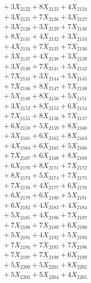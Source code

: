 \documentclass[a4paper,10pt]{article}
\begin{document}
{\begin{align}
&\;  + 3 X_{2122} + 8 X_{2123} + 4 X_{2124} \\[0.3ex]
&\;  + 3 X_{2125} + 7 X_{2126} + 3 X_{2127} \\[0.3ex]
&\;  + 3 X_{2128} + 3 X_{2129} + 7 X_{2130} \\[0.3ex]
&\;  + 8 X_{2131} + 4 X_{2132} + 3 X_{2133} \\[0.3ex]
&\;  + 4 X_{2134} + 7 X_{2135} + 7 X_{2136} \\[0.3ex]
&\;  + 3 X_{2137} + 4 X_{2138} + 3 X_{2139} \\[0.5ex]\allowbreak
&\;  + 3 X_{2140} + 7 X_{2141} + 5 X_{2142} \\[0.3ex]
&\;  + 7 X_{2143} + 3 X_{2144} + 5 X_{2145} \\[0.3ex]
&\;  + 7 X_{2146} + 8 X_{2147} + 7 X_{2148} \\[0.3ex]
&\;  + 5 X_{2149} + 8 X_{2150} + 5 X_{2151} \\[0.3ex]
&\;  + 3 X_{2152} + 8 X_{2153} + 6 X_{2154} \\[0.3ex]
&\;  + 7 X_{2155} + 8 X_{2156} + 7 X_{2157} \\[0.3ex]
&\;  + 6 X_{2158} + 5 X_{2159} + 8 X_{2160} \\[0.3ex]
&\;  + 3 X_{2161} + 6 X_{2162} + 8 X_{2163} \\[0.3ex]
&\;  + 4 X_{2164} + 6 X_{2165} + 5 X_{2166} \\[0.3ex]
&\;  + 7 X_{2167} + 6 X_{2168} + 8 X_{2169} \\[0.5ex]\allowbreak
&\;  + 6 X_{2170} + 8 X_{2171} + 7 X_{2172} \\[0.3ex]
&\;  + 8 X_{2173} + 5 X_{2174} + 7 X_{2175} \\[0.3ex]
&\;  + 7 X_{2176} + 4 X_{2177} + 6 X_{2178} \\[0.3ex]
&\;  + 6 X_{2179} + 6 X_{2180} + 5 X_{2181} \\[0.3ex]
&\;  + 6 X_{2182} + 4 X_{2183} + 4 X_{2184} \\[0.3ex]
&\;  + 5 X_{2185} + 4 X_{2186} + 7 X_{2187} \\[0.3ex]
&\;  + 7 X_{2188} + 7 X_{2189} + 6 X_{2190} \\[0.3ex]
&\;  + 5 X_{2191} + 4 X_{2192} + 5 X_{2193} \\[0.3ex]
&\;  + 7 X_{2194} + 7 X_{2195} + 7 X_{2196} \\[0.3ex]
&\;  + 7 X_{2197} + 7 X_{2198} + 6 X_{2199} \\[0.5ex]\allowbreak
&\;  + 5 X_{2200} + 5 X_{2201} + 8 X_{2202} \\[0.3ex]
&\;  + 5 X_{2203} + 5 X_{2204} + 4 X_{2205} \\[0.3ex]

\end{align}}
\end{document}

